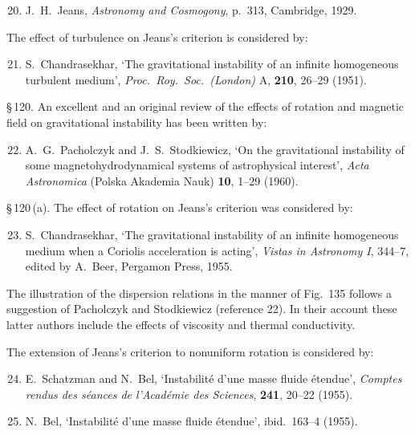 \begin{enumerate}
\setcounter{enumi}{19}
\item J.\ H.\ Jeans, \textit{Astronomy and Cosmogony}, p.\ 313, Cambridge, 1929.
\end{enumerate}

The effect of turbulence on Jeans's criterion is considered by:

\begin{enumerate}
\setcounter{enumi}{20}
\item S.\ Chandrasekhar, `The gravitational instability of an infinite homogeneous turbulent medium', \textit{Proc.\ Roy.\ Soc.\ (London)} A, \textbf{210}, 26--29 (1951).
\end{enumerate}

\S\,120. An excellent and an original review of the effects of rotation and magnetic field on gravitational instability has been written by:

\begin{enumerate}
\setcounter{enumi}{21}
\item A.\ G.\ Pacholczyk and J.\ S.\ Stodkiewicz, `On the gravitational instability of some magnetohydrodynamical systems of astrophysical interest', \textit{Acta Astronomica} (Polska Akademia Nauk) \textbf{10}, 1--29 (1960).
\end{enumerate}

\S\,120\,(a). The effect of rotation on Jeans's criterion was considered by:

\begin{enumerate}
\setcounter{enumi}{22}
\item S.\ Chandrasekhar, `The gravitational instability of an infinite homogeneous medium when a Coriolis acceleration is acting', \textit{Vistas in Astronomy I}, 344--7, edited by A.\ Beer, Pergamon Press, 1955.
\end{enumerate}

The illustration of the dispersion relations in the manner of Fig.~135 follows a suggestion of Pacholczyk and Stodkiewicz (reference 22). In their account these latter authors include the effects of viscosity and thermal conductivity.

The extension of Jeans's criterion to nonuniform rotation is considered by:

\begin{enumerate}
\setcounter{enumi}{23}
\item E.\ Schatzman and N.\ Bel, `Instabilit\'e d'une masse fluide \'etendue', \textit{Comptes rendus des s\'eances de l'Acad\'emie des Sciences}, \textbf{241}, 20--22 (1955).
\item N.\ Bel, `Instabilit\'e d'une masse fluide \'etendue', ibid.\ 163--4 (1955).
\end{enumerate}

